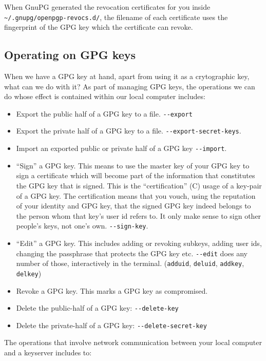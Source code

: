 When GnuPG generated the revocation certificates for you inside
\verb+~/.gnupg/openpgp-revocs.d/+, the filename of each certificate uses the
fingerprint of the GPG key which the certificate can revoke.

\subsection{Operating on GPG keys}

When we have a GPG key at hand, apart from using it as a crytographic key, what
can we do with it? As part of managing GPG keys, the operations we can do whose
effect is contained within our local computer includes:
\begin{itemize}
  \item Export the public half of a GPG key to a file. \verb+--export+ 
  \item Export the private half of a GPG key to a file.
      \verb+--export-secret-keys+.
  \item Import an exported public  or private half of a GPG key \verb+--import+.
  \item “Sign” a GPG key. This means to use the master key of your GPG key to
      sign a certificate which will become part of the information that
      constitutes the GPG key that is signed. This is the “certification” (C)
      usage of a key-pair of a GPG key. The certification means that you vouch,
      using the reputation of your identity and GPG key, that the signed GPG
      key indeed belongs to the person whom that key’s user id refers to. It
      only make sense to sign other people’s keys, not one’s own.
      \verb+--sign-key+.
  \item “Edit” a GPG key. This includes adding or revoking subkeys, adding user
      ids, changing the passphrase that protects the GPG key etc.
      \verb+--edit+ does any number of those, interactively in the terminal.
      (\verb+adduid+, \verb+deluid+, \verb+addkey+, \verb+delkey+) 
  \item Revoke a GPG key. This marks a GPG key as compromised. 
  \item Delete the public-half of a GPG key: \verb+--delete-key+
  \item Delete the private-half of a GPG key: \verb+--delete-secret-key+
\end{itemize}

The operations that involve network communication between your local computer
and a keyserver includes to:

